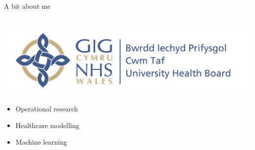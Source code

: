 \documentclass{beamer}
\begin{document}
\begin{frame}{A bit about me}
\begin{columns}[T]
\begin{column}{.5\textwidth}
            \vspace{10pt}
            \includegraphics[width=\linewidth]{cthb_logo.jpg}\\
            \vspace{5pt}

            \begin{itemize}
                \item[] Operational research
                \item[] Healthcare modelling
                \item[] Machine learning
            \end{itemize}
        \end{column}
    \end{columns}

\end{frame}
\end{document}
